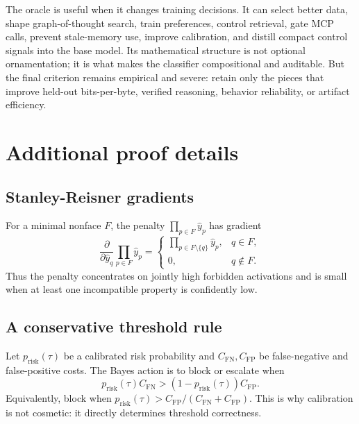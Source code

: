 \documentclass[11pt]{article}
\numberwithin{equation}{section}
\begin{document}
The oracle is useful when it changes training decisions. It can select better data, shape graph-of-thought search, train preferences, control retrieval, gate MCP calls, prevent stale-memory use, improve calibration, and distill compact control signals into the base model. Its mathematical structure is not optional ornamentation; it is what makes the classifier compositional and auditable. But the final criterion remains empirical and severe: retain only the pieces that improve held-out bits-per-byte, verified reasoning, behavior reliability, or artifact efficiency.

\appendix
\section{Additional proof details}
\subsection{Stanley-Reisner gradients}
For a minimal nonface $F$, the penalty $\prod_{p\in F}\hat y_p$ has gradient
\begin{equation}
\frac{\partial}{\partial \hat y_q}\prod_{p\in F}\hat y_p=
\begin{cases}
\prod_{p\in F\setminus\{q\}}\hat y_p,& q\in F,\\
0,& q\notin F.
\end{cases}
\end{equation}
Thus the penalty concentrates on jointly high forbidden activations and is small when at least one incompatible property is confidently low.

\subsection{A conservative threshold rule}
Let $p_{\mathrm{risk}}(\tau)$ be a calibrated risk probability and $C_{\mathrm{FN}},C_{\mathrm{FP}}$ be false-negative and false-positive costs. The Bayes action is to block or escalate when
\begin{equation}
p_{\mathrm{risk}}(\tau)C_{\mathrm{FN}}>(1-p_{\mathrm{risk}}(\tau))C_{\mathrm{FP}}.
\end{equation}
Equivalently, block when $p_{\mathrm{risk}}(\tau)>C_{\mathrm{FP}}/(C_{\mathrm{FN}}+C_{\mathrm{FP}})$. This is why calibration is not cosmetic: it directly determines threshold correctness.
\end{document}
